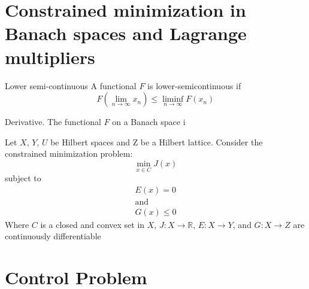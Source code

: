 \section{Constrained minimization in Banach spaces and Lagrange multipliers}

\begin{definition}{Lower semi-continuous} A functional $F$ is lower-semicontinuous if
	\begin{equation}
		F\left(\lim_{n\rightarrow\infty}x_n\right) \leq \liminf_{n\rightarrow \infty} F(x_n)
	\end{equation}
	
\end{definition}
	
\begin{definition}{Derivative.} The functional $F$ on a Banach space i
	
\end{definition}



Let $X$, $Y$, $U$ be Hilbert spaces and Z be a Hilbert lattice. 
Consider the constrained minimization problem:
\begin{equation*}
	\min_{x\in C} J(x)
\end{equation*}
subject to 
\begin{gather*}
	E(x)=0 \\ \text{and} \\ G(x)\leq 0
\end{gather*}
Where $C$ is a closed and convex set in $X$, $J: X \rightarrow \mathbb{R}$, $E: X\rightarrow Y$, and $G: X \rightarrow Z$ are continuously differentiable
\section{Control Problem}
